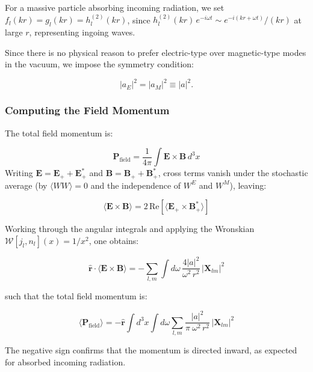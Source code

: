 \documentclass {article}
\renewcommand\vec{\mathbf}
\let\OldHat\hat
\renewcommand{\hat}[1]{\OldHat{\mathbf{#1}}}
\begin{document}
For a massive particle absorbing incoming radiation, we set $f_l(kr) = g_l(kr) = h_l^{(2)}(kr)$, since $h_l^{(2)}(kr)\, e^{-i\omega t} \sim e^{-i(kr + \omega t)}/(kr)$ at large $r$, representing ingoing waves.

Since there is no physical reason to prefer electric-type over magnetic-type modes in the vacuum, we impose the symmetry condition:


\begin{equation}
|a_E|^2 = |a_M|^2 \equiv |a|^2.
\end{equation}

\subsubsection{Computing the Field Momentum}

The total field momentum is:

\begin{equation}
\vec{P}_{\text{field}} = \frac{1}{4\pi} \int \vec{E} \times \vec{B} \, d^3x
\end{equation}
\noindent Writing $\vec{E} = \vec{E}_+ + \vec{E}_+^*$ and $\vec{B} = \vec{B}_+ + \vec{B}_+^*$, cross terms vanish under the stochastic average (by $\langle WW \rangle = 0$ and the independence of $W^E$ and $W^M$), leaving:

\begin{equation}
\langle \vec{E} \times \vec{B} \rangle = 2\,\text{Re}\left[\langle \vec{E}_+ \times \vec{B}_+^* \rangle\right]
\end{equation}

\noindent Working through the angular integrals and applying the Wronskian $\mathcal{W}[j_l, n_l](x) = 1/x^2$, one obtains:

\begin{equation}
\boxed{
	\hat{r} \cdot \langle \vec{E} \times \vec{B} \rangle = -\sum_{l,m} \int d\omega\, \frac{4|a|^2}{\omega^2\, r^2}\, |\vec{X}_{lm}|^2
}
\end{equation}


\noindent such that the total field momentum is:

\begin{equation}
\langle \vec{P}_{\text{field}} \rangle = -	\hat{r} \int d^3x \int d\omega \sum_{l,m} \frac{|a|^2}{\pi ~ \omega^2\, r^2}\, |\vec{X}_{lm}|^2
\end{equation}

\noindent The negative sign confirms that the momentum is directed inward, as expected for absorbed incoming radiation.
\end{document}
